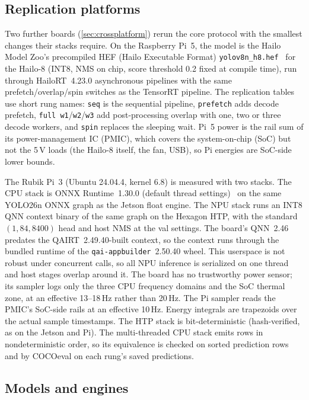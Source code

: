 \subsection{Replication platforms}
\label{sec:replplatforms}

Two further boards (\cref{sec:crossplatform}) rerun
the core protocol with the smallest changes their stacks require. On
the Raspberry Pi~5, the model is the Hailo Model Zoo's precompiled
HEF (Hailo Executable Format) \texttt{yolov8n\_h8.hef}~\cite{hailo2023modelzoo} for the
Hailo-8 (INT8, NMS on chip, score threshold 0.2 fixed at compile time),
run through HailoRT~4.23.0 asynchronous pipelines with the same
prefetch/overlap/spin switches as the TensorRT pipeline. The
replication tables use short rung names: \texttt{seq} is the sequential
pipeline, \texttt{prefetch} adds decode prefetch, \texttt{full
w1}/\texttt{w2}/\texttt{w3} add post-processing overlap with one, two
or three decode workers, and \texttt{spin} replaces the sleeping wait.
Pi~5 power is the rail sum of its power-management IC (PMIC), which
covers the system-on-chip (SoC) but not the 5\,V loads (the Hailo-8
itself, the fan, USB), so Pi energies are SoC-side lower bounds.

The Rubik Pi~3 (Ubuntu 24.04.4, kernel 6.8) is measured with two
stacks. The CPU stack is ONNX Runtime~1.30.0 (default thread
settings)~\cite{onnxruntime} on the same YOLO26n ONNX graph as the
Jetson float engine. The NPU stack runs an INT8 QNN context binary of
the same graph on the Hexagon HTP, with the standard
$(1{,}84{,}8400)$ head and host NMS at the val settings. The board's
QNN~2.46 predates the QAIRT~2.49.40-built context, so the context runs
through the bundled runtime of the \texttt{qai-appbuilder}~2.50.40
wheel. This userspace is not robust under concurrent calls, so all NPU
inference is serialized on one thread and host stages overlap around
it. The board has no trustworthy power sensor; its sampler logs only
the three CPU frequency domains and the SoC thermal zone, at an
effective 13--18\,Hz rather than 20\,Hz. The Pi sampler reads the
PMIC's SoC-side rails at an effective 10\,Hz. Energy integrals are
trapezoids over the actual sample timestamps. The HTP stack is
bit-deterministic (hash-verified, as on the Jetson and Pi). The
multi-threaded CPU stack emits rows in nondeterministic order, so its
equivalence is checked on sorted prediction rows and by COCOeval on
each rung's saved predictions.

\subsection{Models and engines}

